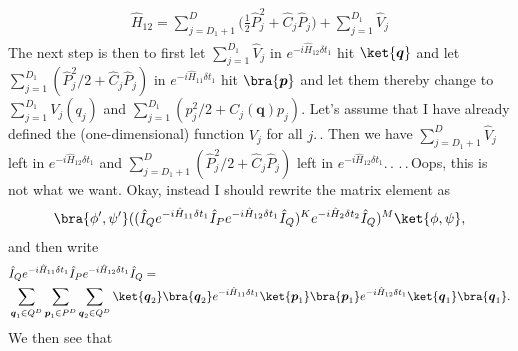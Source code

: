 \documentclass{report}
\begin{document}
\begin{align}
\begin{aligned}
	\hat H_{12} = 
		\sum_{j=D_1+1}^{D} \big(
			\frac{1}{2} \hat P_{j}^2 + 
			\hat C_{j} \hat P_{j}
		\big) + 
		\sum_{j=1}^{D_1}
			\hat V_{j} 
\end{aligned}
\end{align} 
The next step is then to first let $\sum_{j=1}^{D_1} \hat V_{j}$ in $e^{-i \hat H_{12} \delta t_1}$ hit $\ket{\boldsymbol{q}}$ and let $\sum_{j=1}^{D_1} (\hat P_{j}^2 / 2 + \hat C_{j} \hat P_{j})$ in $e^{-i \hat H_{11} \delta t_1}$ hit $\bra{\boldsymbol{p}}$ and let them thereby change to $\sum_{j=1}^{D_1} V_{j}(q_j)$ and $\sum_{j=1}^{D_1} ( p_{j}^2 / 2 + C_{j}(\boldsymbol{q}) p_{j})$. Let's assume that I have already defined the (one-dimensional) function $V_j$ for all $j$.\,. Then we have $\sum_{j=D_1+1}^{D} \hat V_{j}$ left in $e^{-i \hat H_{12} \delta t_1}$ and $\sum_{j=D_1+1}^{D} (\hat P_{j}^2 / 2 + \hat C_{j} \hat P_{j})$ left in $e^{-i \hat H_{12} \delta t_1}$.\,. .\,.\,Oops, this is not what we want. Okay, instead I should rewrite the matrix element as
\begin{align}
\begin{aligned}
	\bra{\phi', \psi'}  
		(
			(
				\hat I_Q 
				e^{-i  \hat H_{11} \delta t_1 } 
				\hat I_P 
				e^{-i \hat H_{12} \delta t_1} \hat I_Q
			)^{K}
			e^{-i  \hat H_{2} \delta t_2}
			\hat I_Q
		)^M 
	\ket{\phi, \psi},
\end{aligned}
\end{align}
and then write
\begin{align}
\begin{aligned}
	&\hat I_Q e^{-i  \hat H_{11} \delta t_1 } \hat I_P e^{-i \hat H_{12} \delta t_1} \hat I_Q
	=\\&
	\sum_{\boldsymbol{q}_1 \in Q^D} \sum_{\boldsymbol{p}_1 \in P^D} \sum_{\boldsymbol{q}_2 \in Q^D} 
		\ket{\boldsymbol{q}_2}\bra{\boldsymbol{q}_2}
		e^{-i  \hat H_{11} \delta t_1 } 
		\ket{\boldsymbol{p}_1}\bra{\boldsymbol{p}_1}
		e^{-i \hat H_{12} \delta t_1}
		\ket{\boldsymbol{q}_1}\bra{\boldsymbol{q}_1}.
\end{aligned}
\end{align}
We then see that 
\end{document}
